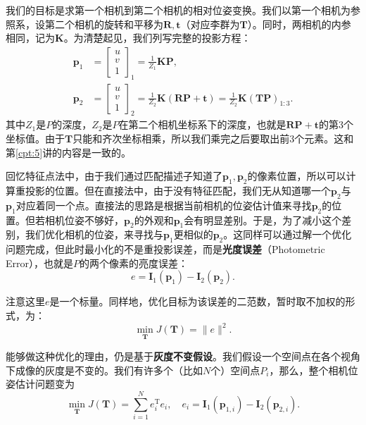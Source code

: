 我们的目标是求第一个相机到第二个相机的相对位姿变换。我们以第一个相机为参照系，设第二个相机的旋转和平移为$\bm{R}, \bm{t}$（对应李群为$\bm{T}$）。同时，两相机的内参相同，记为$\bm{K}$。为清楚起见，我们列写完整的投影方程：
\begin{align*}
{\bm{p}_1} &= {\left[ \begin{array}{l}
	u\\
	v\\
	1
	\end{array} \right]_1} = \frac{1}{Z_1} \bm{KP}, \\
{\bm{p}_2} &= {\left[ \begin{array}{l}
	u\\
	v\\
	1
	\end{array} \right]_2} = \frac{1}{Z_2} \bm{K}\left( {\bm{RP} +\bm{t}} \right) = \frac{1}{Z_2} \bm{K} \left(\bm{T}  \bm{P} \right)_{1:3}.
\end{align*}
其中$Z_1$是$P$的深度，$Z_2$是$P$在第二个相机坐标系下的深度，也就是$\bm{RP}+\bm{t}$的第3个坐标值。由于$\bm{T}$只能和齐次坐标相乘，所以我们乘完之后要取出前3个元素。这和第\ref{cpt:5}讲的内容是一致的。

回忆特征点法中，由于我们通过匹配描述子知道了$\bm{p}_1, \bm{p}_2$的像素位置，所以可以计算重投影的位置。但在直接法中，由于没有特征匹配，我们无从知道哪一个$\bm{p}_2$与$\bm{p}_1$对应着同一个点。直接法的思路是根据当前相机的位姿估计值来寻找$\bm{p}_2$的位置。但若相机位姿不够好，$\bm{p}_2$的外观和$\bm{p}_1$会有明显差别。于是，为了减小这个差别，我们优化相机的位姿，来寻找与$\bm{p}_1$更相似的$\bm{p}_2$。这同样可以通过解一个优化问题完成，但此时最小化的不是重投影误差，而是\textbf{光度误差}（Photometric Error），也就是$P$的两个像素的亮度误差：
\begin{equation}
e = {\bm{I}_1}\left( {{\bm{p}_1}} \right) - {\bm{I}_2}\left( {{\bm{p}_2}} \right).
\end{equation}

注意这里$e$是一个标量。同样地，优化目标为该误差的二范数，暂时取不加权的形式，为：
\begin{equation}
\mathop {\min }\limits_{\bm{T}}  J\left( \bm{T}  \right) = \|e\|^2.
\end{equation}

能够做这种优化的理由，仍是基于\textbf{灰度不变假设}。我们假设一个空间点在各个视角下成像的灰度是不变的。我们有许多个（比如$N$个）空间点$P_i$，那么，整个相机位姿估计问题变为
\begin{equation}
\mathop {\min }\limits_{\bm{T}}  J\left( \bm{T}  \right) = \sum\limits_{i = 1}^N {e_i^\mathrm{T}{e_i}}, \quad {e_i} = {\bm{I}_1}\left( {{\bm{p}_{1,i}}} \right) - {\bm{I}_2}\left( {{ \bm{p}_{2,i}}} \right).
\end{equation}

